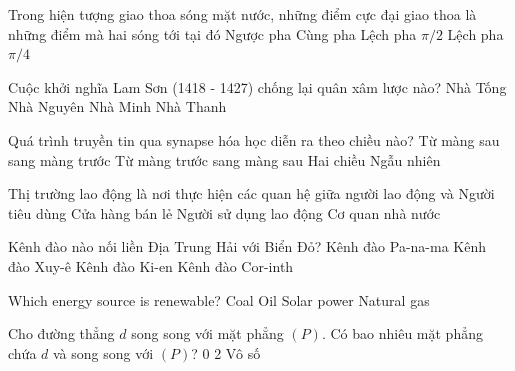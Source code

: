 \begin{ex}
    Trong hiện tượng giao thoa sóng mặt nước, những điểm cực đại giao thoa là những điểm mà hai sóng tới tại đó
    \choice
    {Ngược pha}
    {\True Cùng pha}
    {Lệch pha $\pi/2$}
    {Lệch pha $\pi/4$}

\end{ex}
\begin{ex}
    Cuộc khởi nghĩa Lam Sơn (1418 - 1427) chống lại quân xâm lược nào?
    \choice
    {Nhà Tống}
    {Nhà Nguyên}
    {\True Nhà Minh}
    {Nhà Thanh}

\end{ex}
\begin{ex}
    Quá trình truyền tin qua synapse hóa học diễn ra theo chiều nào?
    \choice
    {Từ màng sau sang màng trước}
    {\True Từ màng trước sang màng sau}
    {Hai chiều}
    {Ngẫu nhiên}

\end{ex}
\begin{ex}
    Thị trường lao động là nơi thực hiện các quan hệ giữa người lao động và
    \choice
    {Người tiêu dùng}
    {Cửa hàng bán lẻ}
    {\True Người sử dụng lao động}
    {Cơ quan nhà nước}

\end{ex}
\begin{ex}
    Kênh đào nào nối liền Địa Trung Hải với Biển Đỏ?
    \choice
    {Kênh đào Pa-na-ma}
    {\True Kênh đào Xuy-ê}
    {Kênh đào Ki-en}
    {Kênh đào Cor-inth}

\end{ex}
\begin{ex}
    Which energy source is renewable?
    \choice
    {Coal}
    {Oil}
    {\True Solar power}
    {Natural gas}

\end{ex}
\begin{ex}
    Cho đường thẳng $d$ song song với mặt phẳng $(P)$. Có bao nhiêu mặt phẳng chứa $d$ và song song với $(P)$?
    \choice
    {0}
    {}
    {2}
    {Vô số}

\end{ex}
